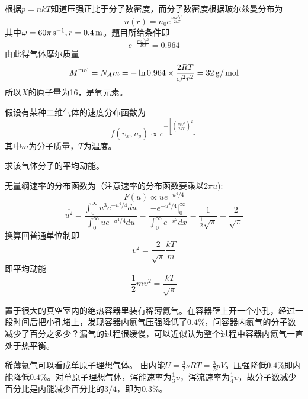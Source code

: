 \documentclass[CJK]{beamer}
\begin{document}
\begin{frame}
  \bch
  根据$p = nkT$知道压强正比于分子数密度，而分子数密度根据玻尔兹曼分布为
  $$ n(r) = n_0e^{\frac{m\omega^2 r^2}{2kT}}$$
  其中$\omega = 60\pi \,\mathrm{s}^{-1}, r= 0.4\,\mathrm{m}$。题目所给条件即
  $$e^{-\frac{m\omega^2 r^2}{2kT}}=0.964$$
  由此得气体摩尔质量
  $$ M^{\rm mol} = N_Am = -\ln 0.964\times \frac{2RT}{\omega^2r^2} = 32\,\mathrm{g}/\,\mathrm{mol}$$
  所以$X$的原子量为16，是氧元素。
  \ech
\end{frame}


\begin{frame}
  \chtitle{\proid (\sthree)}
  \bch
  假设有某种二维气体的速度分布函数为
  $$f(\upsilon_x,\upsilon_y)\propto e^{-\left[\left(\frac{m\upsilon^2}{2kT}\right)^2\right]}$$
  其中$m$为分子质量，$T$为温度。

  求该气体分子的平均动能。
  \ech
\end{frame}

\begin{frame}
  \bch
      {\small
        无量纲速率的分布函数为（注意速率的分布函数要乘以$2\pi u$):
        $$F(u) \propto u e^{-u^4/4}$$
$$        \overline{u^2} = \frac{\int_0^\infty u^3e^{-u^4/4}du}{\int_0^\infty ue^{-u^4/4}du} =      \frac{ -e^{-u^4/4}|_0^\infty }{\int_0^\infty e^{-x^2}dx} =\frac{1}{\frac{1}{2}\sqrt{\pi}} = \frac{2}{\sqrt{\pi}} $$
        换算回普通单位制即
        $$\overline{\upsilon^2} = \frac{2}{\sqrt{\pi}} \frac{kT}{m}$$
        即平均动能
        $$\frac{1}{2}m \overline{\upsilon^2} = \frac{kT}{\sqrt{\pi}}$$
  }
  \ech
\end{frame}


\begin{frame}
  \chtitle{\proid (\sfour)}
  \bch
  置于很大的真空室内的绝热容器里装有稀薄氦气。在容器壁上开一个小孔，经过一段时间后把小孔堵上，发现容器内氦气压强降低了$0.4\%$，问容器内氦气的分子数减少了百分之多少？漏气的过程很缓慢，可以近似认为整个过程中容器内氦气一直处于热平衡。
  \ech
\end{frame}

\begin{frame}
  \bch
        稀薄氦气可以看成单原子理想气体。
        由内能$U = \frac{3}{2}\nu RT = \frac{3}{2}pV$。压强降低$0.4\%$即内能降低$0.4\%$。对单原子理想气体，泻能速率为$\frac{1}{3}\overline{\upsilon}$，泻流速率为$\frac{1}{4}\overline{\upsilon}$，故分子数减少百分比是内能减少百分比的$3/4$，即为$0.3\%$。        
  \ech
\end{frame}
\end{document}
